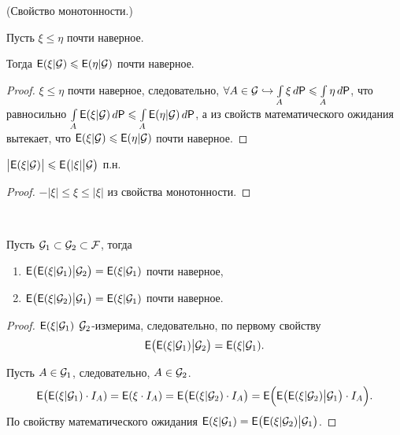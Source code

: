 \begin{property} (Свойство монотонности.)~

	Пусть $\xi \leqslant \eta$ почти наверное. 
	
	Тогда $\mathsf{E}(\xi | \mathcal{G}) \leqslant \mathsf{E}( \eta | \mathcal{G})$ почти наверное.
	\begin{proof}
		$\xi \leqslant \eta$ почти наверное, следовательно, $\forall A \in \mathcal{G} \hookrightarrow  \int\limits_A \xi \, d \mathsf{P} \leqslant \int\limits_A \eta \, d\mathsf{P}$, что равносильно $\int\limits_A \mathsf{E} (\xi | \mathcal{G} ) \, d\mathsf{P} \leqslant \int\limits_A \mathsf{E}( \eta | \mathcal{G}) \, d \mathsf{P}$, а из свойств математического ожидания вытекает, что $\mathsf{E}(\xi | \mathcal{G}) \leqslant \mathsf{E}( \eta | \mathcal{G})$ почти наверное.
	\end{proof}
\end{property}

\begin{property}
	$\big|\mathsf{E} ( \xi | \mathcal{G}) \big| \leqslant \mathsf{E} \big( |\xi| \big| \mathcal{G} \big)$ п.н.
	\begin{proof}
		$-|\xi| \leqslant \xi \leqslant |\xi|$ из свойства монотонности.
	\end{proof}
\end{property}

\begin{property}~

	Пусть $\mathcal{G}_1 \subset \mathcal{G}_2 \subset \mathcal{F}$, тогда
	\begin{enumerate}
		\item $\mathsf{E} \big( \mathsf{E}( \xi | \mathcal{G}_1) \big| \mathcal{G}_2 \big) = \mathsf{E}( \xi | \mathcal{G}_1 )$ почти наверное,
		\item $\mathsf{E} \big( \mathsf{E}( \xi | \mathcal{G}_2) \big| \mathcal{G}_1 \big) = \mathsf{E}( \xi | \mathcal{G}_1 )$ почти наверное.
	\end{enumerate}
	\begin{proof}
		$\mathsf{E} ( \xi | \mathcal{G}_1)$ $\mathcal{G}_2$-измерима, следовательно, по первому свойству 
		$$\mathsf{E} \big( \mathsf{E}( \xi | \mathcal{G}_1) \big| \mathcal{G}_2 \big) = \mathsf{E}( \xi | \mathcal{G}_1).$$
		
		Пусть $A \in \mathcal{G}_1$, следовательно, $A \in \mathcal{G}_2$.
		\begin{equation*}
			\mathsf{E} \big( \mathsf{E}( \xi | \mathcal{G}_1) \cdot I_A) = \mathsf{E}( \xi \cdot I_A) = \mathsf{E} \big( \mathsf{E} (\xi | \mathcal{G}_2) \cdot I_A \big) = \mathsf{E} \Big( \mathsf{E} \big( \mathsf{E}(\xi | \mathcal{G}_2) \big| \mathcal{G}_1 \big) \cdot I_A \Big).
		\end{equation*}
		По свойству математического ожидания $\mathsf{E} (\xi | \mathcal{G}_1 ) = \mathsf{E} \big( \mathsf{E}(\xi | \mathcal{G}_2)  \big| \mathcal{G}_1 \big)$.
		
		
	\end{proof}
\end{property}

